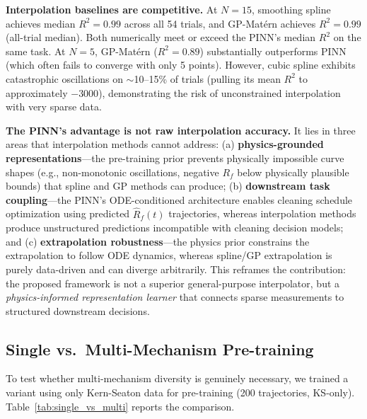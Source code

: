 \documentclass[review]{elsarticle}
\begin{document}
\textbf{Interpolation baselines are competitive.} At $N=15$, smoothing spline achieves median $R^2 = 0.99$ across all 54 trials, and GP-Mat\'{e}rn achieves $R^2 = 0.99$ (all-trial median). Both numerically meet or exceed the PINN's median $R^2$ on the same task. At $N=5$, GP-Mat\'{e}rn ($R^2 = 0.89$) substantially outperforms PINN (which often fails to converge with only 5 points). However, cubic spline exhibits catastrophic oscillations on $\sim$10--15\% of trials (pulling its mean $R^2$ to approximately $-3000$), demonstrating the risk of unconstrained interpolation with very sparse data.

\textbf{The PINN's advantage is not raw interpolation accuracy.} It lies in three areas that interpolation methods cannot address: (a) \textbf{physics-grounded representations}---the pre-training prior prevents physically impossible curve shapes (e.g., non-monotonic oscillations, negative $R_f$ below physically plausible bounds) that spline and GP methods can produce; (b) \textbf{downstream task coupling}---the PINN's ODE-conditioned architecture enables cleaning schedule optimization using predicted $\hat{R}_f(t)$ trajectories, whereas interpolation methods produce unstructured predictions incompatible with cleaning decision models; and (c) \textbf{extrapolation robustness}---the physics prior constrains the extrapolation to follow ODE dynamics, whereas spline/GP extrapolation is purely data-driven and can diverge arbitrarily. This reframes the contribution: the proposed framework is not a superior general-purpose interpolator, but a \textit{physics-informed representation learner} that connects sparse measurements to structured downstream decisions.

\subsection{Single vs.\ Multi-Mechanism Pre-training}
\label{sec:single_vs_multi}

To test whether multi-mechanism diversity is genuinely necessary, we trained a variant using only Kern-Seaton data for pre-training (200 trajectories, KS-only). Table~\ref{tab:single_vs_multi} reports the comparison.
\end{document}
